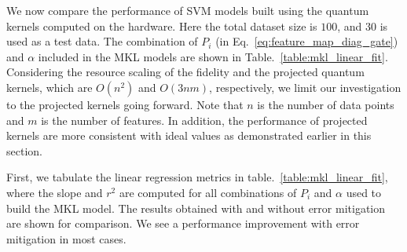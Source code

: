 \documentclass[reprint,amsfonts, amssymb, amsmath,  showkeys, nofootinbib,pra, superscriptaddress, twocolumn,longbibliography]{revtex4-2}
\begin{document}
We now compare the performance of SVM models built using the quantum kernels computed on the hardware. Here the total dataset size is $100$, and $30$ is used as a test data. The combination of $P_i$ (in Eq.~\ref{eq:feature_map_diag_gate}) and $\alpha$ included in the MKL models are shown in Table.~\ref{table:mkl_linear_fit}. Considering the resource scaling of the fidelity and the projected quantum kernels, which are $O(n^2)$ and $O(3nm)$, respectively, we limit our investigation to the projected kernels going forward. Note that $n$ is the number of data points and $m$ is the number of features. In addition, the performance of projected kernels are more consistent with ideal values as demonstrated earlier in this section.

First, we tabulate the linear regression metrics in table.~\ref{table:mkl_linear_fit}, where the slope and $r^2$ are computed for all combinations of $P_i$ and $\alpha$ used to build the MKL model. 
The results obtained with and without error mitigation are shown for comparison. We see a performance improvement with error mitigation in most cases.
\end{document}
